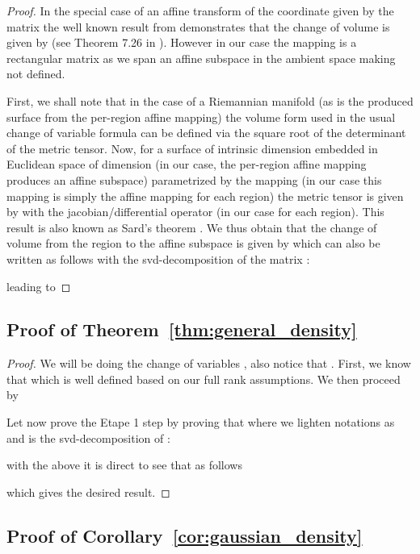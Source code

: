 \begin{proof}
In the special case of an affine transform of the coordinate given by the matrix  the well known result from demonstrates that the change of volume is given by
 (see Theorem 7.26 in \cite{rudin2006real}). However in our case the mapping is a rectangular matrix as we span an affine subspace in the ambient space  making  not defined. 


First, we shall note that in the case of a Riemannian manifold (as is the produced surface from the per-region affine mapping) the volume form used in the usual change of variable formula can be defined via the square root of the determinant of the metric tensor. Now,  for a surface of intrinsic dimension  embedded in Euclidean space of dimension  (in our case, the per-region affine mapping produces an affine subspace) parametrized by the mapping  (in our case this mapping is simply the affine mapping  for each region) the metric tensor is given by   with  the jacobian/differential operator (in our case  for each region). This result is also known as Sard's theorem \citep{spivak2018calculus}. We thus obtain that the change of volume from the region  to the affine subspace  is given by  which can also be written as follows with  the svd-decomposition of the matrix :

leading to

\end{proof}




\subsection{Proof of Theorem~\ref{thm:general_density}}
\label{proof:general_density}


\begin{proof}
We will be doing the change of variables , also notice that  .
First, we know that
 which is well defined based on our full rank assumptions. We then proceed by


Let now prove the Etape 1 step by proving that   where we lighten notations as  and  is the svd-decomposition of :

with the above it is direct to see that  as follows

which gives the desired result.
\end{proof}


\subsection{Proof of Corollary~\ref{cor:gaussian_density}}
\label{appendix:distribution}


